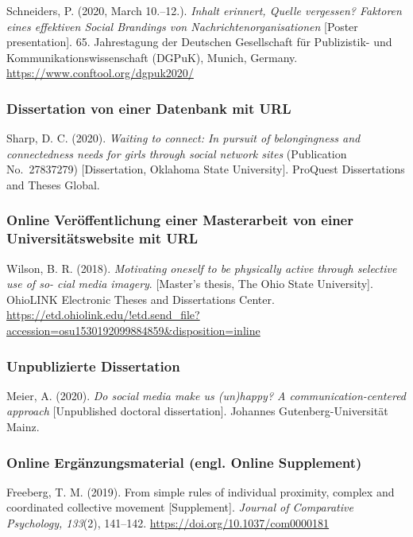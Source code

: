 \documentclass[
  letterpaper,
  DIV=11]{scrreprt}
\begin{document}
Schneiders, P. (2020, March 10.--12.). \emph{Inhalt erinnert, Quelle
vergessen? Faktoren eines effektiven Social Brandings von
Nachrichtenorganisationen} {[}Poster presentation{]}. 65. Jahrestagung
der Deutschen Gesellschaft für Publizistik- und
Kommunikationswissenschaft (DGPuK), Munich, Germany.
\url{https://www.conftool.org/dgpuk2020/}

\subsubsection{Dissertation von einer Datenbank \textbar{} mit
URL}\label{dissertation-von-einer-datenbank-mit-url}

Sharp, D. C. (2020). \emph{Waiting to connect: In pursuit of
belongingness and connectedness needs for girls through social network
sites} (Publication No.~27837279) {[}Dissertation, Oklahoma State
University{]}. ProQuest Dissertations and Theses Global.

\subsubsection{Online Veröffentlichung einer Masterarbeit von einer
Universitätswebsite \textbar{} mit
URL}\label{online-veruxf6ffentlichung-einer-masterarbeit-von-einer-universituxe4tswebsite-mit-url}

Wilson, B. R. (2018). \emph{Motivating oneself to be physically active
through selective use of so- cial media imagery}. {[}Master's thesis,
The Ohio State University{]}. OhioLINK Electronic Theses and
Dissertations Center.
\url{https://etd.ohiolink.edu/!etd.send_file?accession=osu1530192099884859&disposition=inline}

\subsubsection{Unpublizierte
Dissertation}\label{unpublizierte-dissertation}

Meier, A. (2020). \emph{Do social media make us (un)happy? A
communication-centered approach} {[}Unpublished doctoral
dissertation{]}. Johannes Gutenberg-Universität Mainz.

\subsubsection{Online Ergänzungsmaterial (engl. Online
Supplement)}\label{online-erguxe4nzungsmaterial-engl.-online-supplement}

Freeberg, T. M. (2019). From simple rules of individual proximity,
complex and coordinated collective movement {[}Supplement{]}.
\emph{Journal of Comparative Psychology, 133}(2), 141--142.
\url{https://doi.org/10.1037/com0000181}
\end{document}
